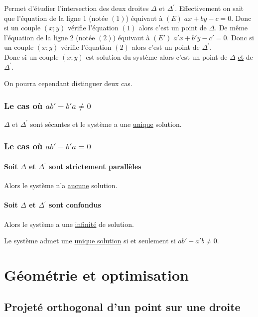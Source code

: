 \documentclass[french]{book}
\begin{document}
Permet d'étudier l'intersection des deux droites  $\Delta$ et $\Delta^{'}$. 
Effectivement on sait que l'équation de la ligne 1 (notée $(1)$) équivaut à $(E)\; ax+by-c=0$. Donc si un couple $(x;y)$ vérifie l'équation $(1)$ alors c'est un point de $\Delta$. De même l'équation de la ligne 2 (notée $(2)$) équivaut à  $(E')\; a'x+b'y-c'=0$. Donc si un couple $(x;y)$ vérifie l'équation $(2)$ alors c'est un point de $\Delta^{'}$. \\

Donc si un couple $(x;y)$ est solution du système alors c'est un point de $\Delta$ \underline{et} de $\Delta^{'}$.

On pourra cependant distinguer deux cas.

\subsection*{Le cas où $ ab'-b'a \neq 0$}
$\Delta$ et $\Delta^{'}$ sont sécantes et le système a une \underline{unique} solution.
\subsection*{Le cas où $ ab'-b'a = 0$}
\subsubsection*{Soit $\Delta$ et $\Delta^{'}$ sont strictement parallèles}
Alors le système n'a \underline{aucune} solution.
\subsubsection*{Soit $\Delta$ et $\Delta^{'}$ sont confondus}
Alors le système a une \underline{infinité} de solution.

\begin{prop}
Le système admet une \underline{unique solution}  si et seulement si $ab'-a'b \neq 0$.
\end{prop}



\chapter{Géométrie et optimisation}

\section{Projeté orthogonal d'un point sur une droite}
\end{document}
